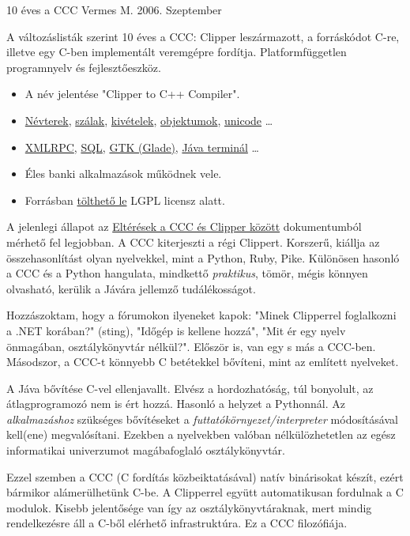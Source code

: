 
\pagetitle%
{10 éves a CCC}%
{Vermes M.}%
{2006. Szeptember}

\medskip

A változáslisták  szerint 10 éves a CCC:
Clipper leszármazott, a forráskódot C-re, 
illetve egy  C-ben implementált veremgépre fordítja.
Platformfüggetlen programnyelv és fejlesztőeszköz.

\begin{itemize}
\item   
    A név jelentése {"}Clipper to C++ Compiler".
\item 
    \href{http://ccc.comfirm.hu/ccc3/ccc-clipper-elteresek.html#NAMESPACE}{Névterek}, 
    \href{http://ccc.comfirm.hu/ccc3/ccc-clipper-elteresek.html#THREADS}{szálak}, 
    \href{http://ccc.comfirm.hu/ccc3/exception.html}{kivételek},
    \href{http://ccc.comfirm.hu/ccc3/objektum.html}{objektumok},
    \href{http://ccc.comfirm.hu/ccc3/ccc3_ujdonsagok.html}{unicode}
    \ldots
\item 
    \href{http://ccc.comfirm.hu/ccc3/xmlrpc-framework.html}{XMLRPC}, 
    \href{http://ccc.comfirm.hu/ccc3/sql2.html}{SQL}, 
    \href{http://ccc.comfirm.hu/ccc3/cccgtk.html}{GTK (Glade)},
    \href{http://ccc.comfirm.hu/ccc3/jterminal.html}{Jáva terminál} \ldots
\item
    Éles banki alkalmazások működnek vele.
\item   
    Forrásban
    \href{http://ccc.comfirm.hu/ccc3/download/olvass.html}{tölthető le} 
    LGPL licensz alatt.
\end{itemize}

A jelenlegi állapot  az
\href{http://ccc.comfirm.hu/ccc3/ccc-clipper-elteresek.html}%
{Eltérések a CCC és Clipper között} dokumentumból mérhető fel legjobban.
A CCC kiterjeszti a régi Clippert.
Korszerű, kiállja az összehasonlítást olyan nyelvekkel, 
mint a Python, Ruby, Pike.
Különösen hasonló a CCC és a Python hangulata,
mindkettő  {\em praktikus}, tömör, mégis 
könnyen olvasható, kerülik a Jávára jellemző tudálékosságot.

Hozzászoktam, hogy  a fórumokon ilyeneket kapok: 
{"}Minek Clipperrel foglalkozni a .NET korában?" (sting),  
{"}Időgép is kellene hozzá",
{"}Mit ér egy nyelv önmagában, osztálykönyvtár nélkül?".
Először is, van egy s más a CCC-ben.  Másodszor, a CCC-t
könnyebb C betétekkel bővíteni, mint az említett nyelveket. 

A Jáva bővítése C-vel ellenjavallt. 
Elvész a hordozhatóság, túl bonyolult,  
az átlagprogramozó nem is ért hozzá.
Hasonló a helyzet a Pythonnál.
Az {\em alkalmazáshoz} szükséges bővítéseket a 
{\em futtatókörnyezet/interpreter} módosításával kell(ene)  
megvalósítani. Ezekben a nyelvekben valóban nélkülözhetetlen 
az egész informatikai univerzumot magábafoglaló osztálykönyvtár. 

Ezzel szemben a CCC (C fordítás közbeiktatásával) natív  
binárisokat készít, ezért bármikor alámerülhetünk C-be.
A Clipperrel együtt automatikusan fordulnak a C modulok. 
Kisebb jelentősége van így  az osztálykönyvtáraknak, 
mert mindig rendelkezésre áll a C-ből elérhető infrastruktúra. 
Ez a CCC filozófiája.


